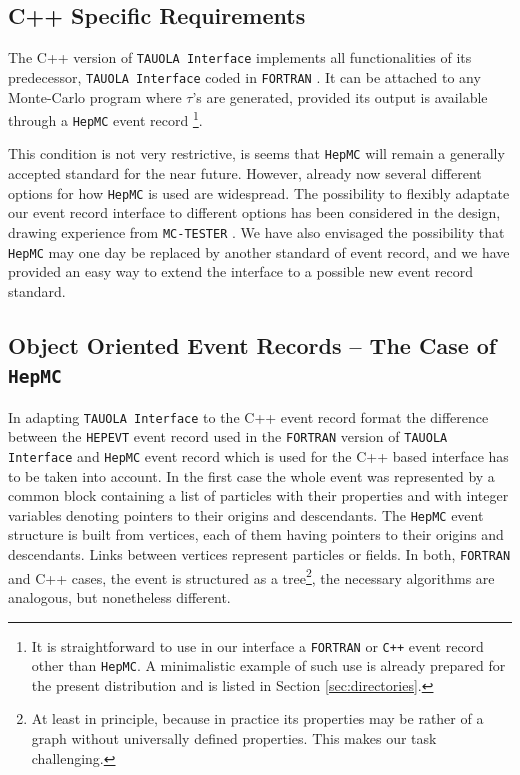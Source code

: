 \documentclass[]{Tauola_interface_design}
\begin{document}
\subsection{C++ Specific Requirements}

The C++ version of {\tt TAUOLA Interface} implements all functionalities
of its predecessor, {\tt TAUOLA  Interface} coded in  {\tt FORTRAN} \cite{Golonka:2003xt}.
It can be attached to any Monte-Carlo program where $\tau$'s
are generated, provided its output is available through a {\tt HepMC} \cite{Dobbs:2001ck} event record%
\footnote{It is straightforward to use in our interface 
a {\tt FORTRAN} or {\tt C++} event record other than {\tt HepMC}.
A minimalistic example of such use is already prepared for the present distribution and
is listed in Section \ref{sec:directories}.}.

This condition is not very restrictive, is seems that {\tt HepMC} will
remain a generally accepted standard for the near future. However,
already now several different options for how {\tt HepMC} is used are
widespread. The possibility to flexibly adaptate our event record 
interface to different
options has been considered in the design,  drawing experience
from {\tt MC-TESTER} \cite{Golonka:2002rz,Davidson:2008ma}. 
We have also
envisaged the possibility that {\tt HepMC} may one day be replaced by another
standard of event record, and we have provided an easy way to extend
the interface to a possible new event record standard.

\subsection{Object Oriented Event Records  -- The Case of {\tt HepMC}}
In adapting {\tt TAUOLA Interface} to the C++ event record format
 the difference between the {\tt HEPEVT} event record used in the {\tt FORTRAN}
version of {\tt TAUOLA Interface} and  {\tt HepMC} event record  
which is used for the C++ based interface
has to be taken into account. 
In the first case the whole event was represented
by a common block containing a list of particles with their properties and
with integer 
variables denoting pointers to their origins and descendants.
 The {\tt HepMC} event structure
is built from vertices, each of them having pointers to their origins and descendants. Links between vertices represent particles or fields.
 In both, {\tt FORTRAN} and C++  
cases, the event is structured as 
a tree\footnote{At least in principle, because in practice its properties
may be rather of a graph without universally defined properties.
This makes our task challenging.}, the necessary algorithms are  analogous, 
but nonetheless different.
\end{document}
